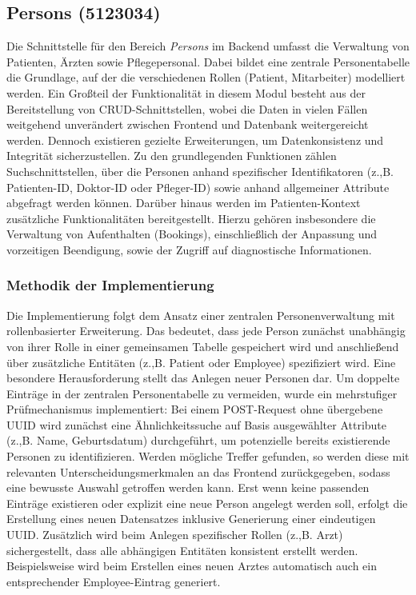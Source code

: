 \subsection{Persons (5123034)}
Die Schnittstelle für den Bereich \textit{Persons} im Backend umfasst die Verwaltung von Patienten, Ärzten sowie Pflegepersonal. Dabei bildet eine zentrale Personentabelle die Grundlage, auf der die verschiedenen Rollen (Patient, Mitarbeiter) modelliert werden.
Ein Großteil der Funktionalität in diesem Modul besteht aus der Bereitstellung von CRUD-Schnittstellen, wobei die Daten in vielen Fällen weitgehend unverändert zwischen Frontend und Datenbank weitergereicht werden. Dennoch existieren gezielte Erweiterungen, um Datenkonsistenz und Integrität sicherzustellen.
Zu den grundlegenden Funktionen zählen Suchschnittstellen, über die Personen anhand spezifischer Identifikatoren (z.,B. Patienten-ID, Doktor-ID oder Pfleger-ID) sowie anhand allgemeiner Attribute abgefragt werden können.
Darüber hinaus werden im Patienten-Kontext zusätzliche Funktionalitäten bereitgestellt. Hierzu gehören insbesondere die Verwaltung von Aufenthalten (Bookings), einschließlich der Anpassung und vorzeitigen Beendigung, sowie der Zugriff auf diagnostische Informationen.
\subsubsection{Methodik der Implementierung}
Die Implementierung folgt dem Ansatz einer zentralen Personenverwaltung mit rollenbasierter Erweiterung. Das bedeutet, dass jede Person zunächst unabhängig von ihrer Rolle in einer gemeinsamen Tabelle gespeichert wird und anschließend über zusätzliche Entitäten (z.,B. Patient oder Employee) spezifiziert wird.
Eine besondere Herausforderung stellt das Anlegen neuer Personen dar. Um doppelte Einträge in der zentralen Personentabelle zu vermeiden, wurde ein mehrstufiger Prüfmechanismus implementiert:
Bei einem POST-Request ohne übergebene UUID wird zunächst eine Ähnlichkeitssuche auf Basis ausgewählter Attribute (z.,B. Name, Geburtsdatum) durchgeführt, um potenzielle bereits existierende Personen zu identifizieren. Werden mögliche Treffer gefunden, so werden diese mit relevanten Unterscheidungsmerkmalen an das Frontend zurückgegeben, sodass eine bewusste Auswahl getroffen werden kann.
Erst wenn keine passenden Einträge existieren oder explizit eine neue Person angelegt werden soll, erfolgt die Erstellung eines neuen Datensatzes inklusive Generierung einer eindeutigen UUID.
Zusätzlich wird beim Anlegen spezifischer Rollen (z.,B. Arzt) sichergestellt, dass alle abhängigen Entitäten konsistent erstellt werden. Beispielsweise wird beim Erstellen eines neuen Arztes automatisch auch ein entsprechender Employee-Eintrag generiert.

